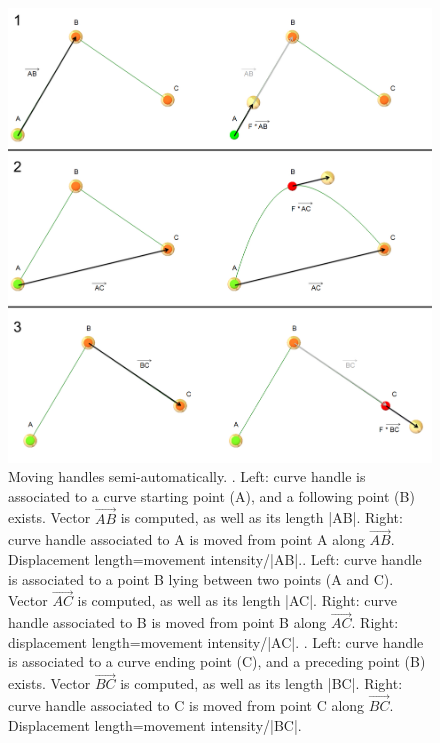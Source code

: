 \begin{figure}
  \centering
  \includegraphics[scale=0.3]{images/Edit_selected_landmarks/Move_2.pdf} 
	\caption{ Moving handles semi-automatically. . Left: curve handle is associated to a curve starting point (A), and a following point (B) exists. Vector $\overrightarrow{AB}$ is computed, as well as its length |AB|. Right: curve handle associated to A is moved from point A along $\overrightarrow{AB}$. Displacement length=movement intensity/|AB|.. Left: curve handle is associated to a point B lying between two points (A and C). Vector $\overrightarrow{AC}$ is computed, as well as its length |AC|. Right: curve handle associated to B is moved from point B along $\overrightarrow{AC}$. Right: displacement length=movement intensity/|AC|.  . Left: curve handle is associated to a curve ending point (C), and a preceding point (B) exists. Vector $\overrightarrow{BC}$ is computed, as well as its length |BC|. Right: curve handle associated to C is moved from point C along $\overrightarrow{BC}$. Displacement length=movement intensity/|BC|. }
	
\label{move_handles}
 
\end{figure}

